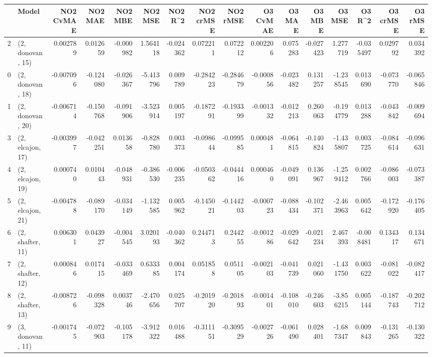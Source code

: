 \begin{tabular}{llrrrrrrrrrrrrrr}
\toprule
{} &             Model &  NO2 CvMAE &   NO2 MAE &   NO2 MBE &    NO2 MSE &   NO2 R\textasciicircum2 &  NO2 crMSE &  NO2 rMSE &  O3 CvMAE &    O3 MAE &    O3 MBE &     O3 MSE &    O3 R\textasciicircum2 &  O3 crMSE &   O3 rMSE \\
\midrule
2  &  (2, donovan, 15) &   0.002789 &  0.012659 & -0.000982 &   1.564118 & -0.024362 &   0.072211 &  0.072212 &  0.002206 &  0.075283 & -0.027423 &   1.277719 & -0.035497 &  0.029792 &  0.034392 \\
0  &  (2, donovan, 18) &  -0.007096 & -0.124080 & -0.026367 &  -5.413796 &  0.009789 &  -0.284223 & -0.284679 & -0.000856 & -0.023482 &  0.131257 &  -1.238545 &  0.013690 & -0.073770 & -0.065846 \\
1  &  (2, donovan, 20) &  -0.006714 & -0.150768 & -0.091906 &  -3.523914 &  0.005197 &  -0.187291 & -0.193399 & -0.001332 & -0.012213 &  0.260063 &  -0.194779 &  0.013288 & -0.043842 & -0.009694 \\
3  &  (2, elcajon, 17) &  -0.003997 & -0.042251 &  0.013658 &  -0.828780 &  0.003373 &  -0.098644 & -0.099585 &  0.000481 & -0.064815 & -0.140824 &  -1.435807 &  0.003725 & -0.084614 & -0.096631 \\
4  &  (2, elcajon, 19) &   0.000740 &  0.010443 & -0.048931 &  -0.386530 & -0.006235 &  -0.050362 & -0.044416 &  0.000460 & -0.049091 &  0.136967 &  -1.259412 &  0.002766 & -0.086003 & -0.073387 \\
5  &  (2, elcajon, 21) &  -0.004788 & -0.089170 & -0.034149 &  -1.132585 &  0.005962 &  -0.145021 & -0.144203 & -0.000723 & -0.088434 & -0.102371 &  -2.463963 &  0.005642 & -0.172920 & -0.176405 \\
6  &  (2, shafter, 11) &   0.006301 &  0.043927 & -0.004545 &   3.020193 & -0.040362 &   0.244713 &  0.244255 & -0.001286 & -0.029642 & -0.021234 &   2.467393 & -0.008481 &  0.134317 &  0.134671 \\
7  &  (2, shafter, 12) &   0.000846 &  0.017415 & -0.033469 &   0.633385 &  0.004174 &   0.051858 &  0.051105 & -0.002103 & -0.041739 &  0.021060 &  -1.431750 &  0.003622 & -0.081022 & -0.082417 \\
8  &  (2, shafter, 13) &  -0.008726 & -0.098328 &  0.003746 &  -2.470656 &  0.025707 &  -0.201920 & -0.201893 & -0.001401 & -0.108010 & -0.246603 &  -3.856215 &  0.005144 & -0.187743 & -0.202712 \\
9  &  (3, donovan, 11) &  -0.001745 & -0.072903 & -0.105178 &  -3.912322 &  0.016488 &  -0.311151 & -0.309529 & -0.002726 & -0.061490 &  0.028401 &  -1.687347 &  0.009843 & -0.131265 & -0.130322 \\

\end{tabular}
